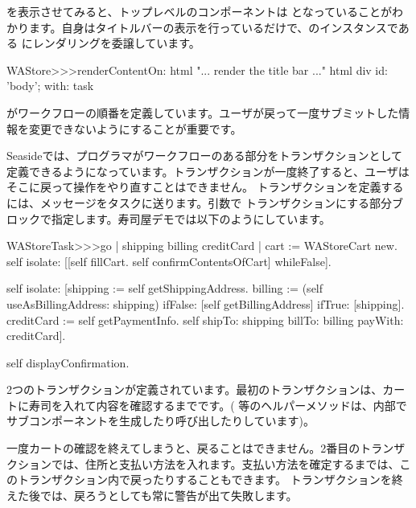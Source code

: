 \documentclass[a4paper,10pt,twoside]{book}
\begin{document}
 を表示させてみると、トップレベルのコンポーネントは となっていることがわかります。自身はタイトルバーの表示を行っているだけで、のインスタンスである にレンダリングを委譲しています。

\begin{code}{}
WAStore>>>renderContentOn: html
	"... render the title bar ..."
	html div id: 'body'; with: task
\end{code}

がワークフローの順番を定義しています。ユーザが戻って一度サブミットした情報を変更できないようにすることが重要です。


Seasideでは、プログラマがワークフローのある部分をトランザクションとして定義できるようになっています。トランザクションが一度終了すると、ユーザはそこに戻って操作をやり直すことはできません。
トランザクションを定義するには、メッセージをタスクに送ります。引数で
トランザクションにする部分ブロックで指定します。寿司屋デモでは以下のようにしています。

\begin{code}{}
WAStoreTask>>>go
	| shipping billing creditCard |
	cart := WAStoreCart new.
	self isolate:
		[[self fillCart.
		self confirmContentsOfCart]
			whileFalse].

	self isolate:
		[shipping := self getShippingAddress.
		billing := (self useAsBillingAddress: shipping)
					ifFalse: [self getBillingAddress]
					ifTrue: [shipping].
		creditCard := self getPaymentInfo.
		self shipTo: shipping billTo: billing payWith: creditCard].

	self displayConfirmation.
\end{code}

2つのトランザクションが定義されています。最初のトランザクションは、カートに寿司を入れて内容を確認するまでです。(  等のヘルパーメソッドは、内部でサブコンポーネントを生成したり呼び出したりしています)。

一度カートの確認を終えてしまうと、戻ることはできません。2番目のトランザクションでは、住所と支払い方法を入れます。支払い方法を確定するまでは、このトランザクション内で戻ったりすることもできます。
トランザクションを終えた後では、戻ろうとしても常に警告が出て失敗します。
\end{document}
